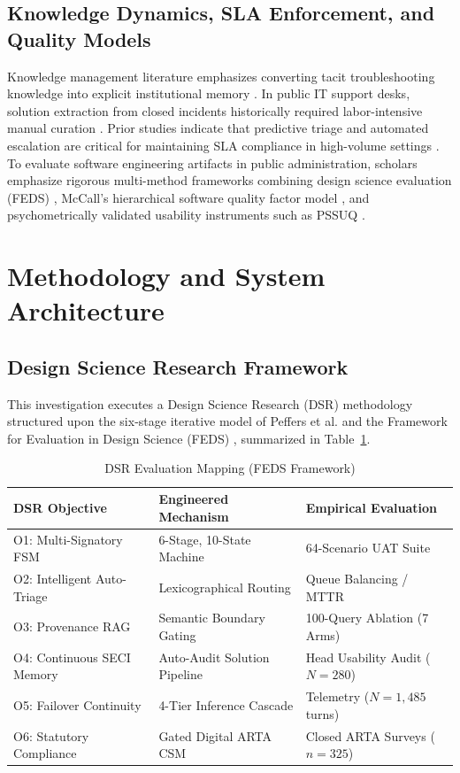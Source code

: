 \documentclass[conference]{IEEEtran}
\begin{document}
\subsection{Knowledge Dynamics, SLA Enforcement, and Quality Models}
Knowledge management literature emphasizes converting tacit troubleshooting knowledge into explicit institutional memory \cite{ref13}. In public IT support desks, solution extraction from closed incidents historically required labor-intensive manual curation \cite{ref23, ref24}. Prior studies indicate that predictive triage and automated escalation are critical for maintaining SLA compliance in high-volume settings \cite{ref25}. To evaluate software engineering artifacts in public administration, scholars emphasize rigorous multi-method frameworks combining design science evaluation (FEDS) \cite{ref26}, McCall's hierarchical software quality factor model \cite{ref14}, and psychometrically validated usability instruments such as PSSUQ \cite{ref15, ref16, ref27}.

\section{Methodology and System Architecture}
\subsection{Design Science Research Framework}
This investigation executes a Design Science Research (DSR) methodology structured upon the six-stage iterative model of Peffers et al. \cite{ref12} and the Framework for Evaluation in Design Science (FEDS) \cite{ref26}, summarized in Table~\ref{tab2}.

\begin{table}[htbp]
\caption{DSR Evaluation Mapping (FEDS Framework)}
\label{tab2}
\centering
\small
\begin{tabular}{lll}
\toprule
\textbf{DSR Objective} & \textbf{Engineered Mechanism} & \textbf{Empirical Evaluation} \\
\midrule
O1: Multi-Signatory FSM & 6-Stage, 10-State Machine & 64-Scenario UAT Suite \\
O2: Intelligent Auto-Triage & Lexicographical Routing & Queue Balancing / MTTR \\
O3: Provenance RAG & Semantic Boundary Gating & 100-Query Ablation (7 Arms) \\
O4: Continuous SECI Memory & Auto-Audit Solution Pipeline & Head Usability Audit ($N=280$) \\
O5: Failover Continuity & 4-Tier Inference Cascade & Telemetry ($N=1,485$ turns) \\
O6: Statutory Compliance & Gated Digital ARTA CSM & Closed ARTA Surveys ($n=325$) \\
\bottomrule
\end{tabular}
\end{table}
\end{document}
